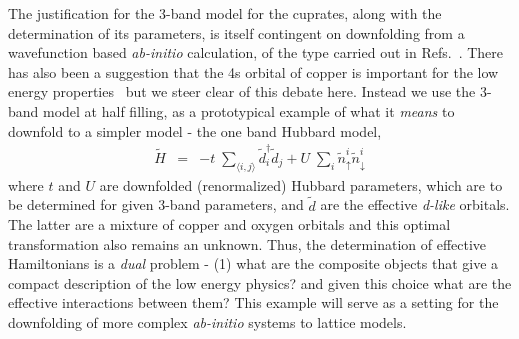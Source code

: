 \documentclass[prl,12pt,onecolumn,nofootinbib,notitlepage,english,superscriptaddress]{revtex4-1}
\begin{document}
The justification for the 3-band model for the cuprates, along with the determination of its parameters, 
is itself contingent on downfolding from a wavefunction based \emph{ab-initio} calculation, 
of the type carried out in Refs.~\cite{Wagner_Abbamonte}. There has also been a suggestion that the 4s orbital of copper is important 
for the low energy properties~\cite{Pavirini} but we steer clear of this debate here. 
Instead we use the 3-band model at half filling, as a prototypical example of what it \emph{means} to downfold to 
a simpler model - the one band Hubbard model, 
\begin{eqnarray}
	\tilde{H} &=&  -t \;\sum_{\langle i,j \rangle} \tilde{d}_i^{\dagger} \tilde{d}_j + U \;\sum_{i} \tilde{n}^{i}_{\uparrow} \tilde{n}^{i}_{\downarrow}
\label{eq:oneband}
\end{eqnarray}
where $t$ and $U$ are downfolded (renormalized) Hubbard parameters, which are to 
be determined for given 3-band parameters, and $\tilde{d}$ are the effective \emph{d-like} orbitals. 
The latter are a mixture of copper and oxygen orbitals and this optimal transformation also remains an unknown. Thus, 
the determination of effective Hamiltonians is a \emph{dual} problem - (1) what are the composite objects that give a 
compact description of the low energy physics? and given this choice what are the effective interactions between them?  
This example will serve as a setting for the downfolding of more complex \emph{ab-initio} systems to lattice 
models. 
\end{document}
